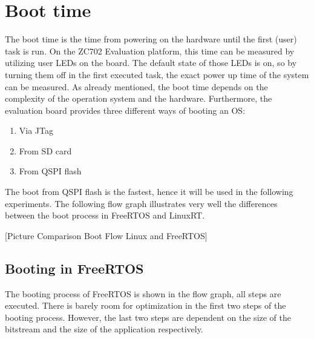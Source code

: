 \section{Boot time}\label{s_boot_time}
The boot time is the time from powering on the hardware until the first (user) task is run. 
On the ZC702 Evaluation platform, this time can be measured by utilizing user \acp{LED} on the board.  
The default state of those LEDs is on, so by turning them off in the first executed task, the exact power up time of the system can be measured.  
As already mentioned\cite{ss_boot_time}, the boot time depends on the complexity of the operation system and the hardware. 
Furthermore, the evaluation board provides three different ways of booting an \ac{OS}:
\begin{enumerate}
	\item Via \ac{JTag}
	\item From \ac{SD} card
	\item From \ac{QSPI} flash
\end{enumerate}
The boot from \ac{QSPI} flash is the fastest, hence it will be used in the following experiments.
The following flow graph illustrates very well the differences between the boot process in FreeRTOS and LinuxRT.

[Picture Comparison Boot Flow Linux and FreeRTOS]

\subsection{Booting in FreeRTOS}
The booting process of FreeRTOS is shown in the flow graph, all steps are executed.
There is barely room for optimization in the first two steps of the booting process. 
However, the last two steps are dependent on the size of the bitstream and the size of the application respectively. 

